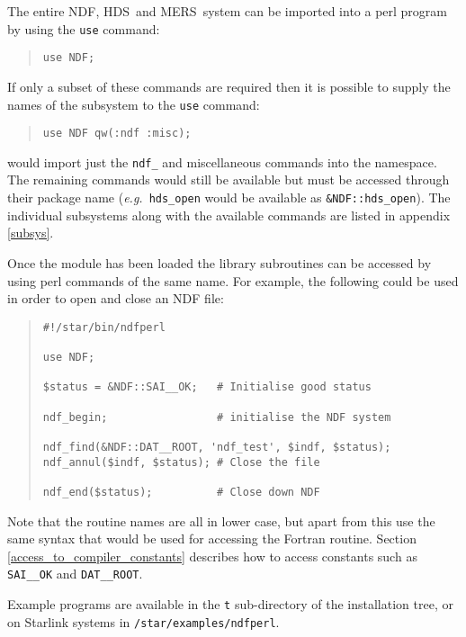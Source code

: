 \documentclass[twoside,11pt]{article}
\newcommand{\xref}[3]{#1}
\newcommand{\ndf}{\xref{NDF}{sun33}{}}
\newcommand{\hds}{\xref{HDS}{sun92}{}}
\newcommand{\mers}{\xref{MERS}{sun104}{}}
\newenvironment{myquote}{\begin{quote}\begin{small}}{\end{small}\end{quote}}
\begin{document}
The entire \ndf, \hds\ and \mers\ system can be imported into a perl program
by using the \texttt{use} command:

\begin{myquote}
\begin{verbatim}
use NDF;
\end{verbatim}
\end{myquote}

If only a subset of these commands are required then it is possible to supply
the names of the subsystem to the \texttt{use} command:

\begin{myquote}
\begin{verbatim}
use NDF qw(:ndf :misc);
\end{verbatim}
\end{myquote}

would import just the \texttt{ndf\_} and miscellaneous commands into
the namespace. The remaining commands would still be available but must
be accessed through their package name (\emph{e.g.}\ \texttt{hds\_open}
would be available as \texttt{\&NDF::hds\_open}). The individual
subsystems along with the available commands are listed in appendix
\ref{subsys}.

Once the module has been loaded the library subroutines can be accessed
by using perl commands of the same name. For example, the following
could be used in order to open and close an NDF file:

\begin{myquote}
\begin{verbatim}
#!/star/bin/ndfperl

use NDF;

$status = &NDF::SAI__OK;   # Initialise good status

ndf_begin;                 # initialise the NDF system

ndf_find(&NDF::DAT__ROOT, 'ndf_test', $indf, $status);
ndf_annul($indf, $status); # Close the file

ndf_end($status);          # Close down NDF
\end{verbatim}
\end{myquote}

Note that the routine names are all in lower case, but apart from this
use the same syntax that would be used for accessing the Fortran
routine.  Section \ref{access_to_compiler_constants} describes how to
access constants such as \texttt{SAI\_\_OK} and \texttt{DAT\_\_ROOT}.

Example programs are available in the \texttt{t} sub-directory of the
installation tree, or on Starlink systems in \texttt{/star/examples/ndfperl}.
\end{document}
